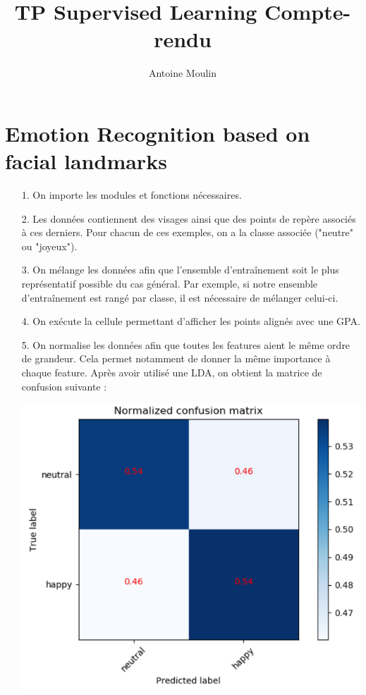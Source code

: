 \documentclass[a4paper, 10pt]{article}
\title{TP Supervised Learning Compte-rendu}
\author{Antoine Moulin}
\date{}
\begin{document}
\maketitle

\section{Emotion Recognition based on facial landmarks}

\begin{itemize}

	\item[1.] On importe les modules et fonctions nécessaires. \\
	
	\item[2.] Les données contiennent des visages ainsi que des points de repère associés à ces derniers. Pour chacun de ces exemples, on a la classe associée ("neutre" ou "joyeux"). \\
	
	\item[3.] On mélange les données afin que l'ensemble d'entraînement soit le plus représentatif possible du cas général. Par exemple, si notre ensemble d'entraînement est rangé par classe, il est nécessaire de mélanger celui-ci. \\
	
	\item[4.] On exécute la cellule permettant d'afficher les points alignés avec une GPA. \\
	
	\item[5.] On normalise les données afin que toutes les features aient le même ordre de grandeur. Cela permet notamment de donner la même importance à chaque feature. Après avoir utilisé une LDA, on obtient la matrice de confusion suivante :
	
\begin{center}
	\includegraphics[scale=0.7]{confusion_matrix.PNG}
\end{center}
	

\end{itemize}
\end{document}
